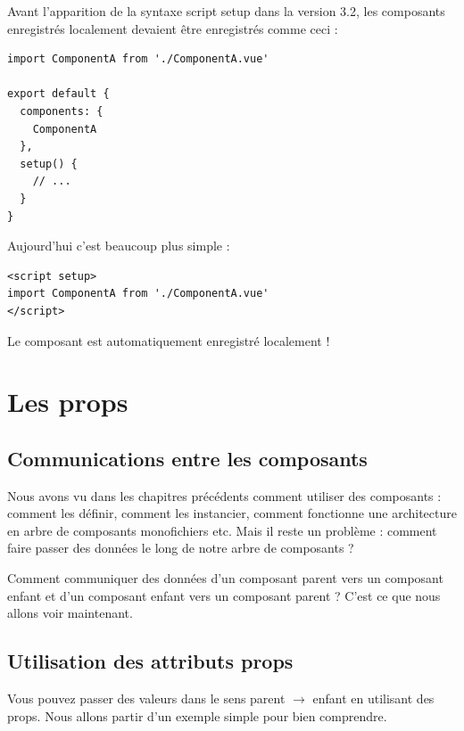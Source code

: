 \documentclass{article}
\begin{document}
Avant l'apparition de la syntaxe {\color{monOrange}script setup} dans la version {\color{monOrange}3.2}, les composants enregistrés localement devaient être enregistrés comme ceci :
\begin{verbatim}
import ComponentA from './ComponentA.vue'

export default {
  components: {
    ComponentA
  },
  setup() {
    // ...
  }
}
\end{verbatim}
Aujourd'hui c'est beaucoup plus simple :
\begin{verbatim}
<script setup>
import ComponentA from './ComponentA.vue'
</script>
\end{verbatim}
Le composant est automatiquement enregistré localement !



\section{Les props}
\subsection{Communications entre les composants}
Nous avons vu dans les chapitres précédents comment utiliser des composants : comment les définir, comment les instancier, comment fonctionne une architecture en arbre de composants monofichiers etc. Mais il reste un problème : comment faire passer des données le long de notre arbre de composants ?

Comment communiquer des données d'un composant parent vers un composant enfant et d'un composant enfant vers un composant parent ? C'est ce que nous allons voir maintenant.

\subsection{Utilisation des attributs {\color{monOrange}props}}
Vous pouvez passer des valeurs dans le sens parent $\to$ enfant en utilisant des {\color{monOrange}props}. Nous allons partir d'un exemple simple pour bien comprendre.
\end{document}
